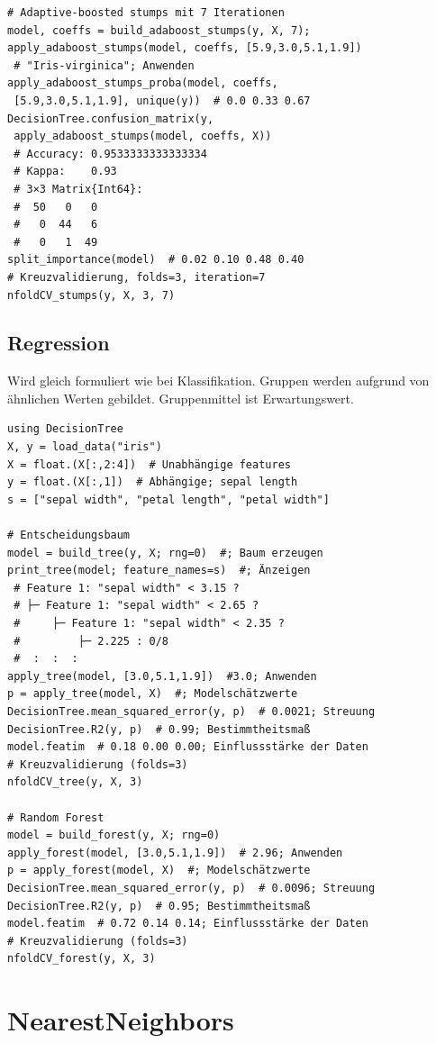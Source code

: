 \documentclass[10pt,twocolumn]{scrartcl}
\begin{document}
\begin{lstlisting}
# Adaptive-boosted stumps mit 7 Iterationen
model, coeffs = build_adaboost_stumps(y, X, 7);
apply_adaboost_stumps(model, coeffs, [5.9,3.0,5.1,1.9])
 # "Iris-virginica"; Anwenden
apply_adaboost_stumps_proba(model, coeffs,
 [5.9,3.0,5.1,1.9], unique(y))  # 0.0 0.33 0.67
DecisionTree.confusion_matrix(y,
 apply_adaboost_stumps(model, coeffs, X))
 # Accuracy: 0.9533333333333334
 # Kappa:    0.93
 # 3×3 Matrix{Int64}:
 #  50   0   0
 #   0  44   6
 #   0   1  49
split_importance(model)  # 0.02 0.10 0.48 0.40
# Kreuzvalidierung, folds=3, iteration=7
nfoldCV_stumps(y, X, 3, 7)
\end{lstlisting}

\subsection{Regression}
\label{ssec:EntscheidungsbaumRegression}

Wird gleich formuliert wie bei Klassifikation. Gruppen werden aufgrund von ähnlichen Werten gebildet. Gruppenmittel ist Erwartungswert.

\begin{lstlisting}
using DecisionTree
X, y = load_data("iris")
X = float.(X[:,2:4])  # Unabhängige features
y = float.(X[:,1])  # Abhängige; sepal length
s = ["sepal width", "petal length", "petal width"]

# Entscheidungsbaum
model = build_tree(y, X; rng=0)  #; Baum erzeugen
print_tree(model; feature_names=s)  #; Änzeigen
 # Feature 1: "sepal width" < 3.15 ?
 # ├─ Feature 1: "sepal width" < 2.65 ?
 #     ├─ Feature 1: "sepal width" < 2.35 ?
 #         ├─ 2.225 : 0/8
 #  :  :  :
apply_tree(model, [3.0,5.1,1.9])  #3.0; Anwenden
p = apply_tree(model, X)  #; Modelschätzwerte
DecisionTree.mean_squared_error(y, p)  # 0.0021; Streuung
DecisionTree.R2(y, p)  # 0.99; Bestimmtheitsmaß
model.featim  # 0.18 0.00 0.00; Einflussstärke der Daten
# Kreuzvalidierung (folds=3)
nfoldCV_tree(y, X, 3)

# Random Forest
model = build_forest(y, X; rng=0)
apply_forest(model, [3.0,5.1,1.9])  # 2.96; Anwenden
p = apply_forest(model, X)  #; Modelschätzwerte
DecisionTree.mean_squared_error(y, p)  # 0.0096; Streuung
DecisionTree.R2(y, p)  # 0.95; Bestimmtheitsmaß
model.featim  # 0.72 0.14 0.14; Einflussstärke der Daten
# Kreuzvalidierung (folds=3)
nfoldCV_forest(y, X, 3)
\end{lstlisting}

\section{NearestNeighbors}
\label{sec:NearestNeighbors}
\end{document}

